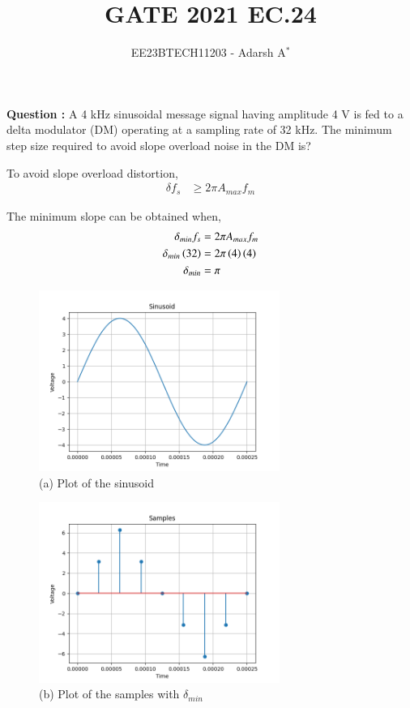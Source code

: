 \documentclass[journal,12pt,onecolumn]{IEEEtran}
\theoremstyle{remark}
\begin{document}
	
	
	\vspace{3cm}
	
	\title{GATE 2021 EC.24}
	\author{EE23BTECH11203 - Adarsh A$^{*}$%
	}
	\maketitle
	\bigskip
	
	\renewcommand{\thefigure}{\theenumi}
	\renewcommand{\thetable}{\theenumi}
	
	
	\vspace{0.2cm}
	\linespread{1.1}
	
	\fontsize{14}{20}\selectfont
	\textbf{Question : }
	A 4 kHz sinusoidal message signal having amplitude 4 V is fed to a delta modulator (DM) operating at a sampling rate of 32 kHz. The minimum step size required to avoid slope overload noise in the DM is?
	
	\vspace{0.3cm}
	\solution
	
	
	
	To avoid slope overload distortion,
	\begin{align}
		\delta f_s &\geq 2\pi A_{max} f_m
	\end{align}
	
	The minimum slope can be obtained when,
	\begin{align}
		\delta_{min} f_s &= 2\pi A_{max} f_m\\
		\delta_{min} \left(32\right) &= 2\pi \left(4\right) \left(4\right)\\
		\delta_{min} &= \pi
	\end{align}
	
	\begin{figure}[htbp]
		\centering
		\includegraphics[width=0.7\textwidth]{figs/Figure_2.png}
		\caption*{(a) Plot of the sinusoid}
	\end{figure}
	
	\begin{figure}[htbp]
		\centering
		\includegraphics[width=0.7\textwidth]{figs/Figure_1.png}
		\caption*{(b) Plot of the samples with $\delta_{min}$}
	\end{figure}
\end{document}

